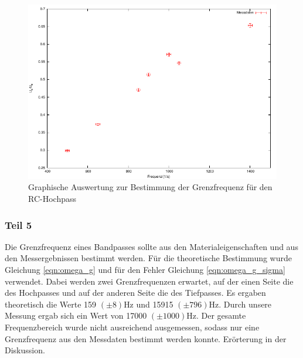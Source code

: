 \documentclass[12pt]{scrartcl}
\begin{document}
\begin{figure}[htbp] 
  \centering
    \includegraphics[scale = 1]{teil_4.pdf}
  	\caption[Graphische Auswertung zur Bestimmung der Grenzfrequenz für den RC-Hochpass]{Graphische Auswertung zur Bestimmung der Grenzfrequenz für den RC-Hochpass}
  \label{fig:teil_4}
\end{figure}

\newpage

\subsubsection{Teil 5}
Die Grenzfrequenz eines Bandpasses sollte aus den Materialeigenschaften und aus den Messergebnissen bestimmt werden. Für die theoretische Bestimmung wurde Gleichung \ref{eqn:omega_g} und für den Fehler Gleichung \ref{eqn:omega_g_sigma} verwendet. Dabei werden zwei Grenzfrequenzen erwartet, auf der einen Seite die des Hochpasses und auf der anderen Seite die des Tiefpasses. Es ergaben theoretisch die Werte 159 $(\pm 8)$Hz  und 15915 $(\pm 796)$Hz. Durch unsere Messung ergab sich ein Wert von 17000 $(\pm 1000)$Hz. Der gesamte Frequenzbereich wurde nicht ausreichend ausgemessen, sodass nur eine Grenzfrequenz aus den Messdaten bestimmt werden konnte. Erörterung in der Diskussion.
\end{document}
